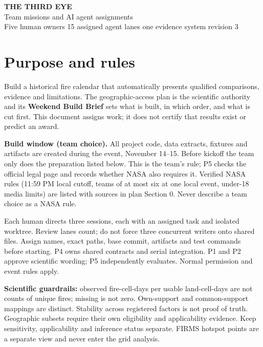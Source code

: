 \documentclass[10pt]{article}
\begin{document}
{\LARGE\bfseries THE THIRD EYE}\\[3pt]
{\Large Team missions and AI agent assignments}\\
Five human owners \textbullet{} 15 assigned agent lanes \textbullet{} one evidence system \textbullet{} revision 3

\section*{Purpose and rules}
Build a historical fire calendar that automatically presents qualified comparisons, evidence and limitations. The geographic-access plan is the scientific authority and its \textbf{Weekend Build Brief} sets what is built, in which order, and what is cut first. This document assigns work; it does not certify that results exist or predict an award.

\textbf{Build window (team choice).} All project code, data extracts, fixtures and artifacts are created during the event, November 14--15. Before kickoff the team only does the preparation listed below. This is the team's rule; P5 checks the official legal page and records whether NASA also requires it. Verified NASA rules (11:59 PM local cutoff, teams of at most six at one local event, under-18 media limits) are listed with sources in plan Section 0. Never describe a team choice as a NASA rule.

Each human directs three sessions, each with an assigned task and isolated worktree. Review lanes count; do not force three concurrent writers onto shared files. Assign names, exact paths, base commit, artifacts and test commands before starting. P4 owns shared contracts and serial integration. P1 and P2 approve scientific wording; P5 independently evaluates. Normal permission and event rules apply.

\textbf{Scientific guardrails:} observed fire-cell-days per usable land-cell-days are not counts of unique fires; missing is not zero. Own-support and common-support mappings are distinct. Stability across registered factors is not proof of truth. Geographic subsets require their own eligibility and applicability evidence. Keep sensitivity, applicability and inference status separate. FIRMS hotspot points are a separate view and never enter the grid analysis.
\end{document}
